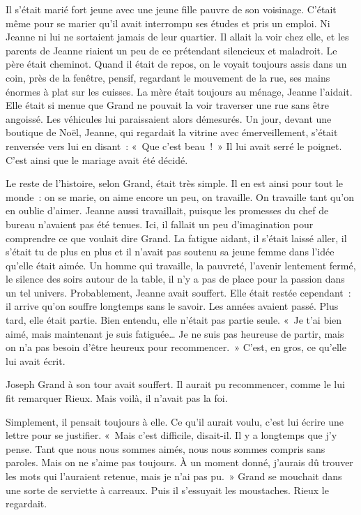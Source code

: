 \documentclass[french,twoside]{book} %
\begin{document}
Il s’était marié fort jeune avec une jeune fille pauvre de son voisinage. C’était même pour se marier qu’il avait interrompu ses études et pris un emploi. Ni Jeanne ni lui ne sortaient jamais de leur quartier. Il allait la voir chez elle, et les parents de Jeanne riaient un peu de ce prétendant silencieux et maladroit. Le père était cheminot. Quand il était de repos, on le voyait toujours assis dans un coin, près de la fenêtre, pensif, regardant le mouvement de la rue, ses mains énormes à plat sur les cuisses. La mère était toujours au ménage, Jeanne l’aidait. Elle était si menue que Grand ne pouvait la voir traverser une rue sans être angoissé. Les véhicules lui paraissaient alors démesurés. Un jour, devant une boutique de Noël, Jeanne, qui regardait la vitrine avec émerveillement, s’était renversée vers lui en disant : « Que c’est beau ! » Il lui avait serré le poignet. C’est ainsi que le mariage avait été décidé.\par
Le reste de l’histoire, selon Grand, était très simple. Il en est ainsi pour tout le monde : on se marie, on aime encore un peu, on travaille. On travaille tant qu’on en oublie d’aimer. Jeanne aussi travaillait, puisque les promesses du chef de bureau n’avaient pas été tenues. Ici, il fallait un peu d’imagination pour comprendre ce que voulait dire Grand. La fatigue aidant, il s’était laissé aller, il s’était tu de plus en plus et il n’avait pas soutenu sa jeune femme dans l’idée qu’elle était aimée. Un homme qui travaille, la pauvreté, l’avenir lentement fermé, le silence des soirs autour de la table, il n’y a pas de place pour la passion dans un tel univers. Probablement, Jeanne avait souffert. Elle était restée cependant : il arrive qu’on souffre longtemps sans le savoir. Les années avaient passé. Plus tard, elle était partie. Bien entendu, elle n’était pas partie seule. « Je t’ai bien aimé, mais maintenant je suis fatiguée… Je ne suis pas heureuse de partir, mais on n’a pas besoin d’être heureux pour recommencer. » C’est, en gros, ce qu’elle lui avait écrit.\par
Joseph Grand à son tour avait souffert. Il aurait pu recommencer, comme le lui fit remarquer Rieux. Mais voilà, il n’avait pas la foi.\par
Simplement, il pensait toujours à elle. Ce qu’il aurait voulu, c’est lui écrire une lettre pour se justifier. « Mais c’est difficile, disait-il. Il y a longtemps que j’y pense. Tant que nous nous sommes aimés, nous nous sommes compris sans paroles. Mais on ne s’aime pas toujours. À un moment donné, j’aurais dû trouver les mots qui l’auraient retenue, mais je n’ai pas pu. » Grand se mouchait dans une sorte de serviette à carreaux. Puis il s’essuyait les moustaches. Rieux le regardait.\par
\end{document}
